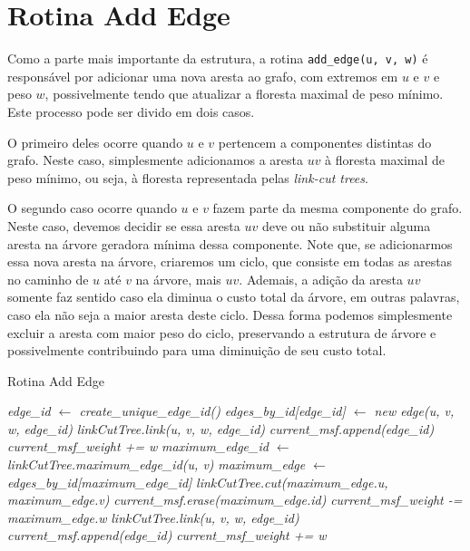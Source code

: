 \section{Rotina Add Edge}
\label{sec:imsf-add-edge}

Como a parte mais importante da estrutura, a rotina \texttt{add\_edge(u, v, w)} é responsável por adicionar uma nova aresta ao grafo, com extremos em $u$ e $v$ e peso $w$, possivelmente tendo que atualizar a floresta maximal de peso mínimo. Este processo pode ser divido em dois casos.

O primeiro deles ocorre quando $u$ e $v$ pertencem a componentes distintas do grafo. Neste caso, simplesmente adicionamos a aresta $uv$ à floresta maximal de peso mínimo, ou seja, à floresta representada pelas \emph{link-cut trees}.

O segundo caso ocorre quando $u$ e $v$ fazem parte da mesma componente do grafo. Neste caso, devemos decidir se essa aresta $uv$ deve ou não substituir alguma aresta na árvore geradora mínima dessa componente. Note que, se adicionarmos essa nova aresta na árvore, criaremos um ciclo, que consiste em todas as arestas no caminho de $u$ até $v$ na árvore, mais $uv$. Ademais, a adição da aresta $uv$ somente faz sentido caso ela diminua o custo total da árvore, em outras palavras, caso ela não seja a maior aresta deste ciclo. Dessa forma podemos simplesmente excluir a aresta com maior peso do ciclo, preservando a estrutura de árvore e possivelmente contribuindo para uma diminuição de seu custo total.

\begin{algorithm}[h!]
    \caption{Rotina Add Edge}\label{imsf-add-edge}
    \begin{algorithmic}
        \State \emph{edge\_id $\gets$ create\_unique\_edge\_id()}
        \State \emph{edges\_by\_id[edge\_id] $\gets$ new edge(u, v, w, edge\_id)}
        \State \emph{linkCutTree.link(u, v, w, edge\_id)}
        \State \emph{current\_msf.append(edge\_id)}
        \State \emph{current\_msf\_weight += w}
        \State \emph{maximum\_edge\_id $\gets$ linkCutTree.maximum\_edge\_id(u, v)}
        \State \emph{maximum\_edge $\gets$ edges\_by\_id[maximum\_edge\_id]}
        \State \emph{linkCutTree.cut(maximum\_edge.u, maximum\_edge.v)}
        \State \emph{current\_msf.erase(maximum\_edge.id)}
        \State \emph{current\_msf\_weight -= maximum\_edge.w}
        \State \emph{linkCutTree.link(u, v, w, edge\_id)}
        \State \emph{current\_msf.append(edge\_id)}
        \State \emph{current\_msf\_weight += w}
        \EndIf
        \EndFunction
    \end{algorithmic}
\end{algorithm}

